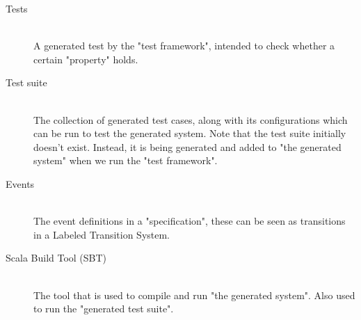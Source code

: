 \begin{description}
\item[Tests]\hfill\\
A generated test by the "test framework", intended to check whether a certain "property" holds.

\item[Test suite]\hfill\\
The collection of generated test cases, along with its configurations which can be run to test the generated system. Note that the test suite initially doesn't exist. Instead, it is being generated and added to "the generated system" when we run the "test framework".

\item[Events]\hfill\\
The event definitions in a "specification", these can be seen as transitions in a Labeled Transition System.

\item[Scala Build Tool (SBT)]\hfill\\
The tool that is used to compile and run "the generated system". Also used to run the "generated test suite".


\end{description}
